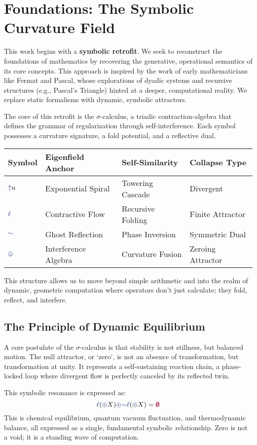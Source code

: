 \section{Foundations: The Symbolic Curvature Field}

This work begins with a \textbf{symbolic retrofit}. We seek to reconstruct the foundations of mathematics by recovering the generative, operational semantics of its core concepts. This approach is inspired by the work of early mathematicians like Fermat and Pascal, whose explorations of dyadic systems and recursive structures (e.g., Pascal's Triangle) hinted at a deeper, computational reality. We replace static formalisms with dynamic, symbolic attractors.

The core of this retrofit is the $\sigma$-calculus, a triadic contraction-algebra that defines the grammar of regularization through self-interference. Each symbol possesses a curvature signature, a fold potential, and a reflective dual.

\begin{center}
\renewcommand{\arraystretch}{1.2}
\begin{tabular}{l l l l}
\hline
\textbf{Symbol} & \textbf{Eigenfield Anchor} & \textbf{Self-Similarity} & \textbf{Collapse Type} \\
\hline
$\grow n$ & Exponential Spiral & Towering Cascade & Divergent \\
$\lha$ & Contractive Flow & Recursive Folding & Finite Attractor \\
$\reflec$ & Ghost Reflection & Phase Inversion & Symmetric Dual \\
$\fuse$ & Interference Algebra & Curvature Fusion & Zeroing Attractor \\
\hline
\end{tabular}
\end{center}

This structure allows us to move beyond simple arithmetic and into the realm of dynamic, geometric computation where operators don't just calculate; they fold, reflect, and interfere.

\subsection{The Principle of Dynamic Equilibrium}
A core postulate of the $\sigma$-calculus is that stability is not stillness, but balanced motion. The null attractor, or `zero`, is not an absence of transformation, but transformation at unity. It represents a self-sustaining reaction chain, a phase-locked loop where divergent flow is perfectly canceled by its reflected twin.

This symbolic resonance is expressed as:
\[ \lha(\fuse X) \fuse \reflec\lha(\fuse X) = \void \]
This is chemical equilibrium, quantum vacuum fluctuation, and thermodynamic balance, all expressed as a single, fundamental symbolic relationship. Zero is not a void; it is a standing wave of computation.

